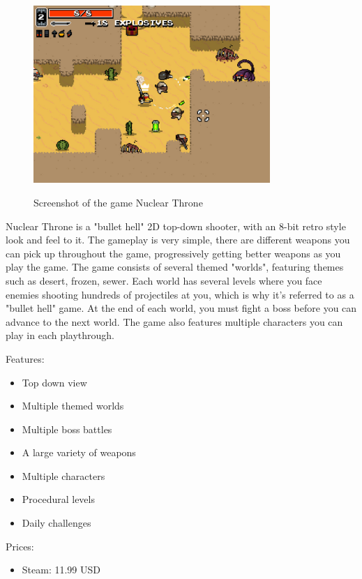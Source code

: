 \documentclass[12p]{article}
\begin{document}
\begin{figure}[ht]
 \center
 \includegraphics[width=0.8\textwidth]{StateOfTheArtScreenshots/nuclearthrone}
 \label{sec:StateOfTheArt_Screenshots_Nulcearthrone}
 \caption{Screenshot of the game Nuclear Throne \cite{NulcearThroneScreenshot}}
\end{figure}

Nuclear Throne is a "bullet hell" 2D top-down shooter, with an 8-bit retro style look and feel to it. The gameplay is very simple, there are different weapons you can pick up throughout the game, progressively getting better weapons as you play the game. The game consists of several themed "worlds", featuring themes such as desert, frozen, sewer. Each world has several levels where you face enemies shooting hundreds of projectiles at you, which is why it's referred to as a "bullet hell" game. At the end of each world, you must fight a boss before you can advance to the next world. The game also features multiple characters you can play in each playthrough.

Features:

\begin{itemize}
 \item Top down view
 \item Multiple themed worlds
 \item Multiple boss battles
 \item A large variety of weapons
 \item Multiple characters
 \item Procedural levels
 \item Daily challenges
\end{itemize}

Prices:

\begin{itemize}
 \item Steam: 11.99 USD
\end{itemize}
\end{document}
